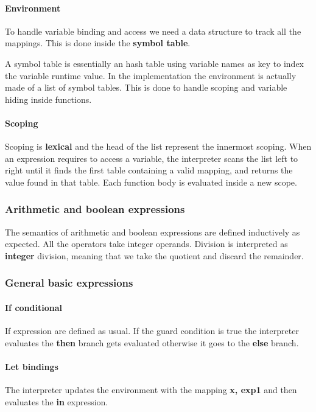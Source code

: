 \documentclass{article}
\begin{document}
\paragraph{Environment}


To handle variable binding and access we need a data structure to track all the mappings.
This is done inside the \textbf{symbol table}. 

A symbol table is essentially an hash table using variable names 
as key to index the variable runtime value. In the implementation the environment is actually made of a list of symbol tables. This is done to handle scoping and variable hiding inside functions. 

\paragraph{Scoping}
Scoping is \textbf{lexical} and the head of the list represent the innermost scoping.
When an expression requires to access a variable, the interpreter scans the list left to right until it finds the first table containing a valid mapping, and returns the value found in that table. 
Each function body is evaluated inside a new scope.

\subsubsection{Arithmetic and boolean expressions}
The semantics of arithmetic and boolean expressions are defined inductively as expected. All the operators take  integer operands. Division is interpreted as \textbf{integer} division, 
meaning that we take the quotient and discard the remainder.

\subsubsection{General basic expressions}

\paragraph{If conditional}
If expression are defined as usual. If the guard condition is true the interpreter evaluates the \textbf{then} branch gets evaluated otherwise it goes to the \textbf{else} branch.

\paragraph{Let bindings}
The interpreter updates the environment with the mapping \textbf{x, exp1} and then evaluates the \textbf{in} expression.
\end{document}
